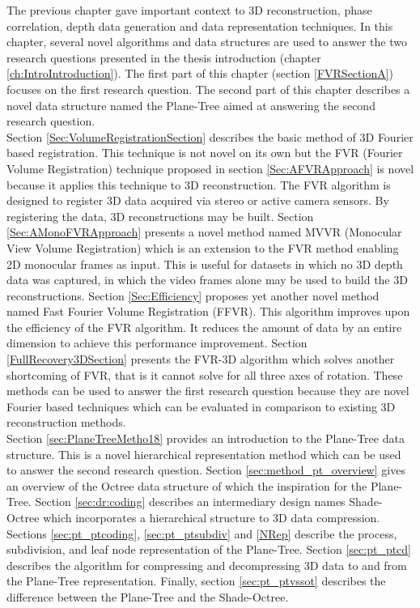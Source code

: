 
The previous chapter gave important context to 3D reconstruction, phase correlation, depth data generation and data representation techniques. In this chapter, several novel algorithms and data structures are used to answer the two research questions presented in the thesis introduction (chapter \ref{ch:IntroIntroduction}). The first part of this chapter (section \ref{FVRSectionA}) focuses on the first research question. The second part of this chapter describes a novel data structure named the Plane-Tree aimed at answering the second research question. \\

Section \ref{Sec:VolumeRegistrationSection} describes the basic method of 3D Fourier based registration. This technique is not novel on its own but the FVR (Fourier Volume Registration) technique proposed in section \ref{Sec:AFVRApproach} is novel because it applies this technique to 3D reconstruction. The FVR algorithm is designed to register 3D data acquired via stereo or active camera sensors. By registering the data, 3D reconstructions may be built. Section \ref{Sec:AMonoFVRApproach} presents a novel method named MVVR (Monocular View Volume Registration) which is an  extension to the FVR method enabling 2D monocular frames as input. This is useful for datasets in which no 3D depth data was captured, in which the video frames alone may be used to build the 3D reconstructions. Section \ref{Sec:Efficiency} proposes yet another novel method named Fast Fourier Volume Registration (FFVR). This algorithm improves upon the efficiency of the FVR algorithm. It reduces the amount of data by an entire dimension to achieve this performance improvement. Section \ref{FullRecovery3DSection} presents the FVR-3D algorithm which solves another shortcoming of FVR, that is it cannot solve for all three axes of rotation. These methods can be used to answer the first research question because they are novel Fourier based techniques which can be evaluated in comparison to existing 3D reconstruction methods. \\

Section \ref{sec:PlaneTreeMetho18} provides an introduction to the Plane-Tree data structure. This is a novel hierarchical representation method which can be used to answer the second research question. Section \ref{sec:method_pt_overview} gives an overview of the Octree data structure of which the inspiration for the Plane-Tree. Section \ref{sec:dr:coding} describes an intermediary design names Shade-Octree which incorporates a hierarchical structure to 3D data compression. Sections \ref{sec:pt_ptcoding}, \ref{sec:pt_ptsubdiv} and \ref{NRep} describe the process, subdivision, and leaf node representation of the Plane-Tree. Section \ref{sec:pt_ptcd} describes the algorithm for compressing and decompressing 3D data to and from the Plane-Tree representation. Finally, section \ref{sec:pt_ptvssot} describes the difference between the Plane-Tree and the Shade-Octree. \\
